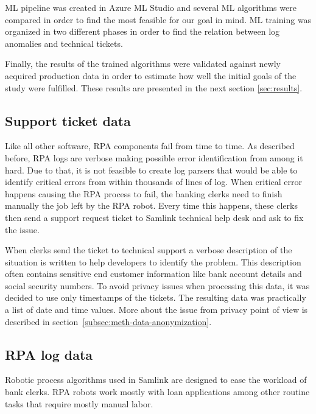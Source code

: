 ML pipeline was created in Azure ML Studio
and several ML algorithms were compared
in order to find the most feasible for our goal in mind.
ML training was organized in two different phases
in order to find the relation between
log anomalies and technical tickets.

Finally,
the results of the trained algorithms
were validated against newly acquired production data
in order to estimate how well the initial goals of the study
were fulfilled.
These results are presented in the next section \ref{sec:results}.


\subsection{Support ticket data}\label{subsec:meth-efecte-ticket-data}

Like all other software,
RPA components fail from time to time.
As described before,
RPA logs are verbose
making possible error identification from among it hard.
Due to that,
it is not feasible to create log parsers
that would be able to identify critical errors
from within thousands of lines of log.
When critical error happens
causing the RPA process to fail,
the banking clerks need to finish manually
the job left by the RPA robot.
Every time this happens,
these clerks then send a support request ticket
to Samlink technical help desk
and ask to fix the issue.

When clerks send the ticket to technical support
a verbose description of the situation is written
to help developers to identify the problem.
This description often contains sensitive end customer information
like bank account details and social security numbers.
To avoid privacy issues when processing this data,
it was decided to use only timestamps of the tickets.
The resulting data was practically a list of date and time values.
More about the issue from privacy point of view
is described in section~\ref{subsec:meth-data-anonymization}.


\subsection{RPA log data}\label{subsec:meth-rpa-log-data}
Robotic process algorithms used in Samlink
are designed to ease the workload of bank clerks.
RPA robots work mostly with loan applications
among other routine tasks
that require mostly manual labor.

